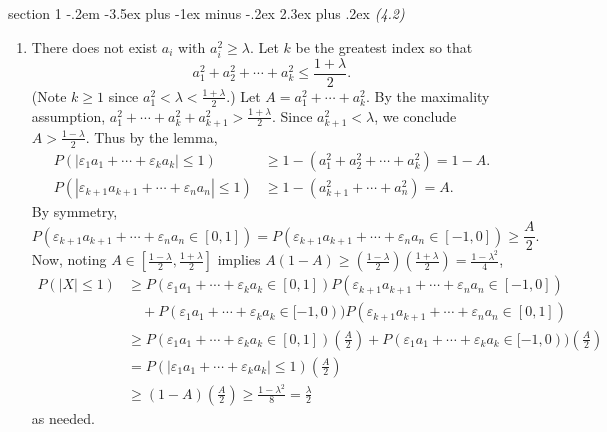 \documentclass[12pt]{article}
\makeatletter
\theoremstyle{norm}
\newcommand{\ep}[0]{\varepsilon}
\newcommand{\la}[0]{\lambda}
\newcommand{\pa}[1]{\left( {#1} \right)}
\newcommand{\pf}[2]{\pa{\frac{#1}{#2}}}
\newenvironment{problem}{\@startsection
       {section}
       {1}
       {-.2em}
       {-3.5ex plus -1ex minus -.2ex}
       {2.3ex plus .2ex}
       {\pagebreak[3]%
       \large\bf\noindent{Problem }
       }
       }
       {%
       }
\makeatother
\begin{document}
\begin{problem} {\it (4.2)}
\begin{enumerate}
\item
There does not exist $a_i$ with $a_i^2\ge \la$. Let $k$ be the greatest index so that
\[
a_1^2+a_2^2+\cdots +a_k^2\le \frac{1+\la}{2}.
\]
(Note $k\ge 1$ since $a_1^2< \la<\frac{1+\la}{2}$.) 
Let $A=a_1^2+\cdots +a_k^2$. 
By the maximality assumption, $a_1^2+\cdots +a_k^2+a_{k+1}^2>\frac{1+\la}{2}$. Since $a_{k+1}^2<\la$, we conclude $A>\frac{1-\la}{2}$. 
Thus by the lemma,
\begin{align*}
P(|\ep_1a_1+\cdots +\ep_ka_k|\le 1)&\ge 1-(a_1^2+a_2^2+\cdots +a_k^2) =1-A.\\
P(|\ep_{k+1}a_{k+1}+\cdots +\ep_na_n|\le 1)&\ge 1-(a_{k+1}^2+\cdots +a_n^2)=A.
\end{align*}
By symmetry, 
\[
P(\ep_{k+1}a_{k+1}+\cdots +\ep_na_n\in [0,1])=
P(\ep_{k+1}a_{k+1}+\cdots +\ep_na_n\in [-1,0])
\ge\frac{A}{2}.
\]
Now, noting $A\in [\frac{1-\la}{2},\frac{1+\la}{2}]$ implies $A(1-A)\ge \pf{1-\la}{2}\pf{1+\la}{2}=\frac{1-\la^2}{4}$,
\begin{align*}
P(|X|\le 1)&\ge P(\ep_1a_1+\cdots +\ep_ka_k \in [0,1])P(\ep_{k+1}a_{k+1}+\cdots +\ep_na_n\in [-1,0])\\
&\quad +P(\ep_1a_1+\cdots +\ep_ka_k \in [-1,0))P(\ep_{k+1}a_{k+1}+\cdots +\ep_na_n\in [0,1])\\
&\ge P(\ep_1a_1+\cdots +\ep_ka_k \in [0,1])\pf A2+P(\ep_1a_1+\cdots +\ep_ka_k \in [-1,0))\pf A2\\
&=P(|\ep_1a_1+\cdots +\ep_ka_k|\le 1)\pf A2\\
&\ge (1-A)\pf A2\ge \frac{1-\la^2}{8}=\frac{\la}{2}
\end{align*}
as needed.
\end{enumerate}
\end{problem}
\end{document}

